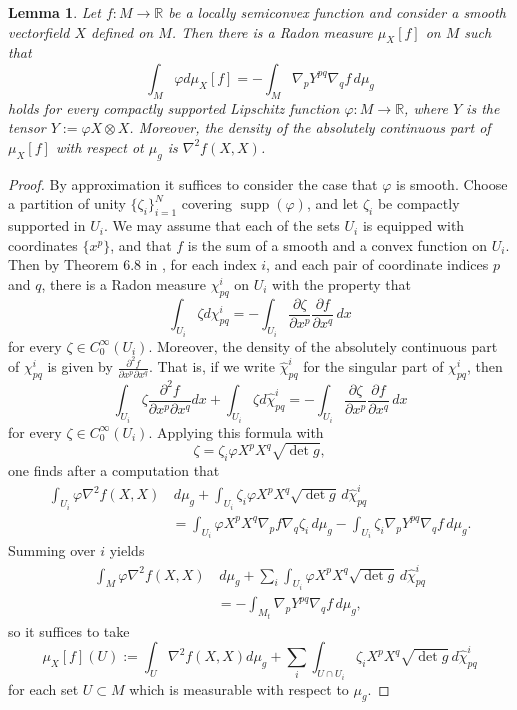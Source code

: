 \documentclass[12pt]{amsart}
\newtheorem{lemma}[theorem]{Lemma}
\DeclareMathOperator{\supp}{supp}
\begin{document}
{\begin{lemma}
\label{lem:semiconvex_dist}
Let $f:M \to \mathbb{R}$ be a locally semiconvex function and consider a smooth vectorfield $X$ defined on $M$. Then there is a Radon measure $\mu_{X}[f]$ on $M$ such that 
\[\int_{M} \varphi d \mu_{X}[f] = - \int_{M} \nabla_p Y^{pq} \nabla_q f \, d\mu_g\]
holds for every compactly supported Lipschitz function $\varphi : M \to \mathbb{R}$, where $Y$ is the tensor $Y := \varphi X \otimes X$. Moreover, the density of the absolutely continuous part of $\mu_{X}[f]$ with respect ot $\mu_g$ is $\nabla^2 f(X,X)$. 
\end{lemma}
\begin{proof}
By approximation it suffices to consider the case that $\varphi$ is smooth. Choose a partition of unity $\{\zeta_i\}_{i=1}^N$ covering $\supp(\varphi)$, and let $\zeta_i$ be compactly supported in $U_i$. We may assume that each of the sets $U_i$ is equipped with coordinates $\{x^p\}$, and that $f$ is the sum of a smooth and a convex function on $U_i$. Then by Theorem 6.8 in \cite{Ev-Gar}, for each index $i$, and each pair of coordinate indices $p$ and $q$, there is a Radon measure $\chi_{pq}^i$ on $U_i$ with the property that
\[\int_{U_i} \zeta d \chi_{pq}^i = - \int_{U_i} \frac{\partial \zeta}{\partial x^p} \frac{\partial f}{\partial x^q} \, dx\]
for every $\zeta \in C^\infty_0(U_i)$. Moreover, the density of the absolutely continuous part of $\chi_{pq}^i$ is given by $\frac{\partial^2 f}{\partial x^p \partial x^q}$. That is, if we write $\hat \chi_{pq}^i$ for the singular part of $\chi_{pq}^i$, then 
\[\int_{U_i} \zeta \frac{\partial^2 f}{\partial x^p \partial x^q} dx + \int_{U_i} \zeta d \hat \chi_{pq}^i = - \int_{U_i} \frac{\partial \zeta}{\partial x^p} \frac{\partial f}{\partial x^q} \, dx\]
for every $\zeta \in C^\infty_0(U_i)$.
Applying this formula with 
\[\zeta = \zeta_i \varphi X^p X^q \sqrt{\det g},\]
one finds after a computation that 
\begin{align*}
\int_{U_i} \varphi \nabla^2 f(X,X) &\, d\mu_g + \int_{U_i} \zeta_i \varphi X^p X^q \sqrt{\det g}\, d \hat \chi_{pq}^i \\
& = \int_{U_i} \varphi X^p X^q \nabla_p f \nabla_q \zeta_i \, d\mu_g - \int_{U_i} \zeta_i \nabla_p Y^{pq} \nabla_q f \,d\mu_g.
\end{align*}
Summing over $i$ yields 
\begin{align*}
\int_{M} \varphi \nabla^2 f(X,X) &\, d\mu_g + \sum_{i} \int_{U_i} \varphi X^p X^q \sqrt{\det g}\, d \hat \chi_{pq}^i \\
& =  - \int_{M_t} \nabla_p Y^{pq} \nabla_q f \,d\mu_g,
\end{align*}
so it suffices to take 
\[\mu_{X}[f](U) := \int_U \nabla^2 f(X,X) d\mu_g + \sum_i \int_{U\cap U_i} \zeta_i X^p X^q \sqrt{\det g}\,d \hat \chi_{pq}^i\]
for each set $U \subset M$ which is measurable with respect to $\mu_g$. 
\end{proof}

}
\end{document}

